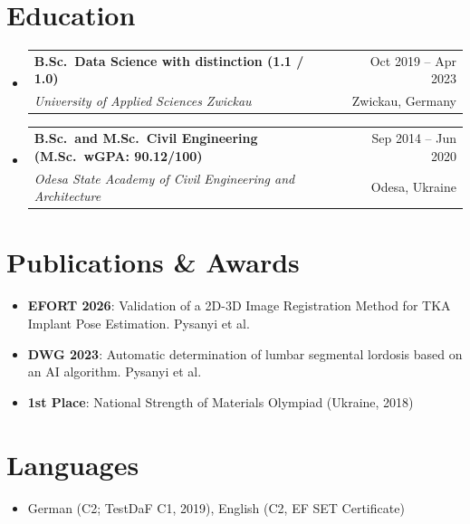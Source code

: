 \documentclass[letterpaper,10pt]{article}
\makeatletter
\newcommand{\resumeItem}[1]{
    \item\small{#1}\vspace{-0.5pt}
}
\newcommand{\resumeSubheading}[4]{
\vspace{2pt}\item
  \begin{tabular*}{0.97\textwidth}[t]{l@{\extracolsep{\fill}}r}
    \textbf{#1} & #2 \\
    \textit{{#3}} & {#4} \\
  \end{tabular*}\vspace{-0pt}
}
\newcommand{\resumeSubHeadingList}{\begin{itemize}[leftmargin=0.15in, label={}]\vspace{-2pt}}
\newcommand{\resumeSubHeadingListEnd}{\end{itemize}}
\makeatother
\begin{document}
\section{Education}
\resumeSubHeadingList
  \resumeSubheading
      {B.Sc.\ Data Science with distinction (1.1 / 1.0)}{Oct 2019 -- Apr 2023}
      {University of Applied Sciences Zwickau}{Zwickau, Germany}
\vspace{-2pt}
  \resumeSubheading
      {B.Sc.\ and M.Sc.\ Civil Engineering (M.Sc.\ wGPA: 90.12/100)}{Sep 2014 -- Jun 2020}
      {Odesa State Academy of Civil Engineering and Architecture}{Odesa, Ukraine}
\resumeSubHeadingListEnd

\section{Publications \& Awards}
\resumeSubHeadingList
  \resumeItem{\textbf{EFORT 2026}: Validation of a 2D-3D Image Registration Method for TKA Implant Pose Estimation. Pysanyi et al.}
  \resumeItem{\textbf{DWG 2023}: Automatic determination of lumbar segmental lordosis based on an AI algorithm. Pysanyi et al.}
  \resumeItem{\textbf{1st Place}: National Strength of Materials Olympiad (Ukraine, 2018)}
\resumeSubHeadingListEnd

\section{Languages}
\resumeSubHeadingList
  \resumeItem{German (C2; TestDaF C1, 2019), English (C2, EF SET Certificate)}
\resumeSubHeadingListEnd
\end{document}
